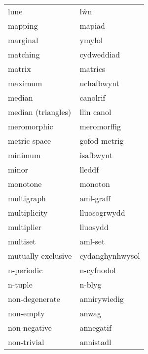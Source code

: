 \begin{supertabular}{p{0.22\textwidth}p{0.22\textwidth}}
                             lune &                              lŵn \\
                          mapping &                           mapiad \\
                         marginal &                           ymylol \\
                         matching &                       cydweddiad \\
                           matrix &                          matrics \\
                          maximum &                       uchafbwynt \\
                           median &                         canolrif \\
               median (triangles) &                       llin canol \\
                      meromorphic &                      meromorffig \\
                     metric space &                     gofod metrig \\
                          minimum &                        isafbwynt \\
                            minor &                           lleddf \\
                         monotone &                          monoton \\
                       multigraph &                        aml-graff \\
                     multiplicity &                     lluosogrwydd \\
                       multiplier &                         lluosydd \\
                         multiset &                          aml-set \\
               mutually exclusive &                  cydanghynhwysol \\
                       n-periodic &                       n-cyfnodol \\
                          n-tuple &                           n-blyg \\
                   non-degenerate &                     annirywiedig \\
                        non-empty &                            anwag \\
                     non-negative &                        annegatif \\
                      non-trivial &                        annistadl \\

\end{supertabular}

